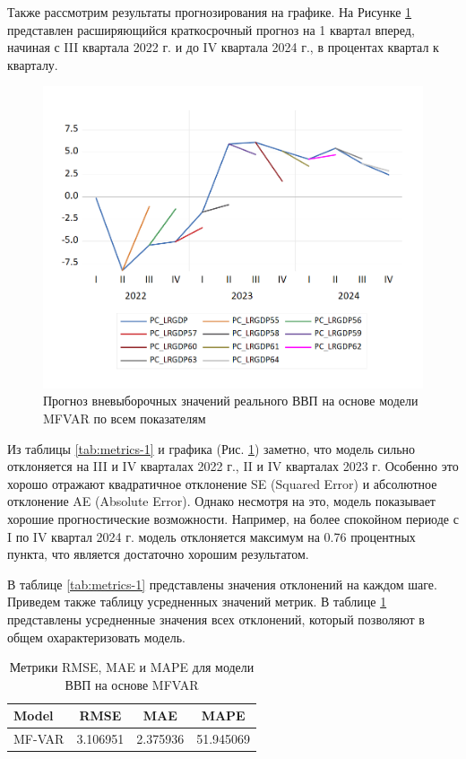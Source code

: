 \documentclass[a4paper, 14pt]{extreport}
\numberwithin{equation}{section}
\numberwithin{equation}{section}
\begin{document}
	Также рассмотрим результаты прогнозирования на графике. На Рисунке \ref{fig:image43} представлен расширяющийся краткосрочный прогноз на 1 квартал вперед, начиная с III квартала 2022 г. и до IV квартала 2024 г., в процентах квартал к кварталу. 
	
	\begin{figure}[h!]
		\centering
		\includegraphics[scale=0.7]{images/image43}
		\caption{Прогноз вневыборочных значений реального ВВП на основе модели MFVAR по всем показателям}
		\label{fig:image43}
	\end{figure}
	
	Из таблицы \ref{tab:metrics-1} и графика (Рис. \ref{fig:image43}) заметно, что модель сильно отклоняется на III и IV кварталах 2022 г., II и IV кварталах 2023 г. Особенно это хорошо отражают квадратичное отклонение SE (Squared Error) и абсолютное отклонение AE (Absolute Error).
	Однако несмотря на это, модель показывает хорошие  прогностические возможности. Например, на более спокойном периоде с I по IV квартал 2024 г. модель отклоняется максимум на 0.76 процентных пункта, что является достаточно хорошим результатом.
	
	В таблице \ref{tab:metrics-1} представлены значения отклонений на каждом шаге. Приведем также таблицу усредненных значений метрик. В таблице \ref{tab:model_metrics} представлены усредненные значения всех отклонений, который позволяют в общем охарактеризовать модель.
	
	\begin{table}[h!]
		\centering
		\caption{Метрики RMSE, MAE и MAPE для модели ВВП на основе MFVAR}
		\begin{tabular}{lccc}
			\toprule
			\textbf{Model} & \textbf{RMSE} & \textbf{MAE} & \textbf{MAPE} \\ 
			\midrule
			MF-VAR & 3.106951 & 2.375936 & 51.945069 \\ 
			\bottomrule
		\end{tabular}
		\label{tab:model_metrics}
	\end{table}
	
\end{document}
